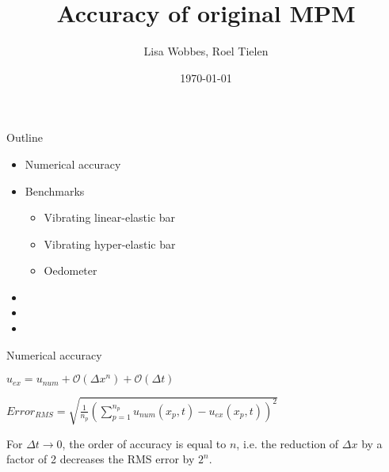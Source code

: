 \documentclass{beamer}
\title[Accuracy of original MPM]{Accuracy of original MPM}
\author[]{Lisa Wobbes, Roel Tielen}
\date[\today]{\today}
\begin{document}
{
\frame{\titlepage}
}

\begin{frame}{Outline}
\begin{itemize}
\item Numerical accuracy
\item Benchmarks
	\begin{itemize}
	\item Vibrating linear-elastic bar 
	\item Vibrating hyper-elastic bar
	\item Oedometer
	\end{itemize}
\item
\item
\item
\end{itemize}
\end{frame}

\begin{frame}{Numerical accuracy}
\begin{tcolorbox}[colback=red!5,colframe=red!50!black,title=Numerical Approximation]
$u_{ex} = u_{num} + \mathcal{O}(\Delta x^n) + \mathcal{O}(\Delta t)$ %
\end{tcolorbox}
\begin{tcolorbox}[colback=red!5,colframe=red!50!black,title=RMS Error]
$Error_{RMS} = \sqrt{\frac{1}{n_p} \left(\sum_{p=1}^{n_p}u_{num}(x_p,t) - u_{ex}(x_p,t)\right)^2}$
\end{tcolorbox}
\begin{tcolorbox}[colback=blue!5,colframe=blue!40!black,title=Accuracy in displacement]
For $\Delta t \to 0$, the order of accuracy is equal to $n$, i.e. the reduction of $\Delta x$ by a factor of 2 decreases the RMS error by $2^n$.
\end{tcolorbox}
\end{frame}
\end{document}
